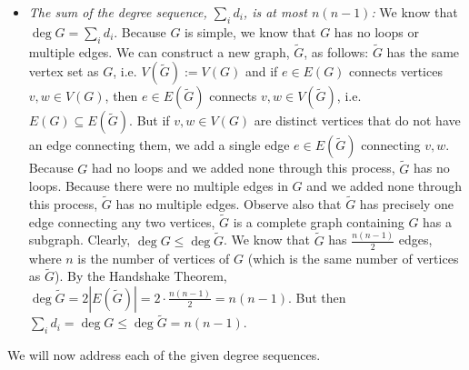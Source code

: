 \documentclass[11pt,letterpaper]{article}
\begin{document}
\begin{itemize}
	\item {\itshape The sum of the degree sequence, $\sum_i d_i$, is at most $n(n - 1)$:} We know that $\deg G= \sum_i d_i$. Because $G$ is simple, we know that $G$ has no loops or multiple edges. We can construct a new graph, $\widetilde{G}$, as follows: $\widetilde{G}$ has the same vertex set as $G$, i.e. $V(\widetilde{G}):= V(G)$ and if $e \in E(G)$ connects vertices $v, w \in V(G)$, then $e \in E(\widetilde{G})$ connects $v, w \in V(\widetilde{G})$, i.e. $E(G) \subseteq E(\widetilde{G})$. But if $v, w \in V(G)$ are distinct vertices that do not have an edge connecting them, we add a single edge $e \in E(\widetilde{G})$ connecting $v, w$. Because $G$ had no loops and we added none through this process, $\widetilde{G}$ has no loops. Because there were no multiple edges in $G$ and we added none through this process, $\widetilde{G}$ has no multiple edges. Observe also that $\widetilde{G}$ has precisely one edge connecting any two vertices, $\widetilde{G}$ is a complete graph containing $G$ has a subgraph. Clearly, $\deg G \leq \deg \widetilde{G}$. We know that $\widetilde{G}$ has $\frac{n(n - 1)}{2}$ edges, where $n$ is the number of vertices of $G$ (which is the same number of vertices as $\widetilde{G}$). By the Handshake Theorem, $\deg \widetilde{G}= 2 |E(\widetilde{G})|= 2 \cdot \frac{n(n - 1)}{2}= n(n - 1)$. But then $\sum_i d_i= \deg G \leq \deg \widetilde{G}= n(n - 1)$.
	\end{itemize} \pspace

We will now address each of the given degree sequences. \pspace
\end{document}
